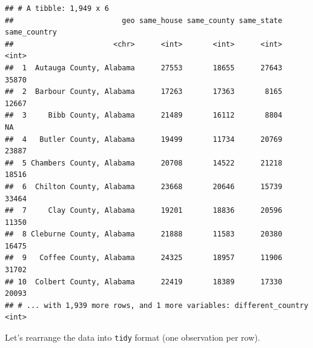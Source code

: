 \documentclass[]{book}
\newenvironment{Shaded}{\begin{snugshade}}{\end{snugshade}}
\newcommand{\KeywordTok}[1]{\textcolor[rgb]{0.13,0.29,0.53}{\textbf{{#1}}}}
\newcommand{\DataTypeTok}[1]{\textcolor[rgb]{0.13,0.29,0.53}{{#1}}}
\newcommand{\StringTok}[1]{\textcolor[rgb]{0.31,0.60,0.02}{{#1}}}
\newcommand{\NormalTok}[1]{{#1}}
\theoremstyle{definition}
\theoremstyle{definition}
\theoremstyle{remark}
\begin{document}
\begin{Shaded}
\end{Shaded}

\begin{verbatim}
## # A tibble: 1,949 x 6
##                         geo same_house same_county same_state same_country
##                       <chr>      <int>       <int>      <int>        <int>
##  1  Autauga County, Alabama      27553       18655      27643        35870
##  2  Barbour County, Alabama      17263       17363       8165        12667
##  3     Bibb County, Alabama      21489       16112       8804           NA
##  4   Butler County, Alabama      19499       11734      20769        23887
##  5 Chambers County, Alabama      20708       14522      21218        18516
##  6  Chilton County, Alabama      23668       20646      15739        33464
##  7     Clay County, Alabama      19201       18836      20596        11350
##  8 Cleburne County, Alabama      21888       11583      20380        16475
##  9   Coffee County, Alabama      24325       18957      11906        31702
## 10  Colbert County, Alabama      22419       18389      17330        20093
## # ... with 1,939 more rows, and 1 more variables: different_country <int>
\end{verbatim}

Let's rearrange the data into \texttt{tidy} format (one observation per
row).
\end{document}
